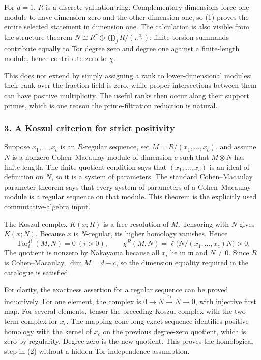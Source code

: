 \documentclass[11pt]{article}
\begin{document}
For $d=1$, $R$ is a discrete valuation ring. Complementary dimensions force one module to have dimension zero and the other dimension one, so (1) proves the entire selected statement in dimension one. The calculation is also visible from the structure theorem
$N\cong R^r\oplus\bigoplus_jR/(\pi^{a_j})$: finite torsion summands contribute equally to Tor degree zero and degree one against a finite-length module, hence contribute zero to $\chi$.

This does not extend by simply assigning a rank to lower-dimensional modules: their rank over the fraction field is zero, while proper intersections between them can have positive multiplicity. The useful ranks then occur along their support primes, which is one reason the prime-filtration reduction is natural.

\subsubsection{3. A Koszul criterion for strict positivity}
Suppose $x_1,\ldots,x_c$ is an $R$-regular sequence, set
$M=R/(x_1,\ldots,x_c)$, and assume $N$ is a nonzero Cohen--Macaulay module of dimension $c$ such that $M\otimes N$ has finite length. The finite quotient condition says that $(x_1,\ldots,x_c)$ is an ideal of definition on $N$, so it is a system of parameters. The standard Cohen--Macaulay parameter theorem says that every system of parameters of a Cohen--Macaulay module is a regular sequence on that module. This theorem is the explicitly used commutative-algebra input.

The Koszul complex $K(x;R)$ is a free resolution of $M$. Tensoring with $N$ gives $K(x;N)$. Because $x$ is $N$-regular, its higher homology vanishes. Hence
\[
 \operatorname{Tor}_i^R(M,N)=0\ (i>0),\qquad
 \chi^R(M,N)=\ell\bigl(N/(x_1,\ldots,x_c)N\bigr)>0.     \tag{2}
\]
The quotient is nonzero by Nakayama because all $x_i$ lie in $\mathfrak m$ and $N\ne0$. Since $R$ is Cohen--Macaulay, $\dim M=d-c$, so the dimension equality required in the catalogue is satisfied.

For clarity, the exactness assertion for a regular sequence can be proved inductively. For one element, the complex is $0\to N\xrightarrow{x_1}N\to0$, with injective first map. For several elements, tensor the preceding Koszul complex with the two-term complex for $x_c$. The mapping-cone long exact sequence identifies positive homology with the kernel of $x_c$ on the previous degree-zero quotient, which is zero by regularity. Degree zero is the new quotient. This proves the homological step in (2) without a hidden Tor-independence assumption.
\end{document}
